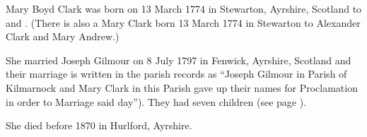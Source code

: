 
Mary Boyd Clark was born on 13 March 1774 in Stewarton, Ayrshire, Scotland to  and .\cite{MBClarkBirth}
(There is also a Mary Clark born 13 March 1774 in Stewarton to Alexander Clark and Mary Andrew.\cite{AncestryMaryClark})

She married Joseph Gilmour on 8 July 1797 in Fenwick, Ayrshire, Scotland \cite{MBClarkMarriage} and their marriage is written in the parish records as ``Joseph Gilmour in Parish of Kilmarnock and Mary Clark in this Parish gave up their names for Proclamation in order to Marriage said day''). They had seven children (see page \pageref{Joseph_Gilmour}).

She died before 1870 in Hurlford, Ayrshire.\cite{JosephGilmourDeath}

